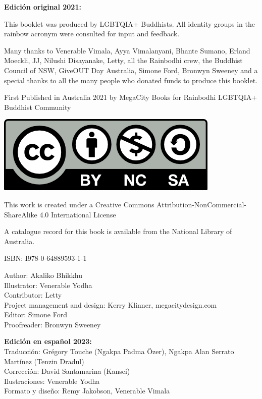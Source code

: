 \documentclass[12pt,openany]{book}
\begin{document}
{\footnotesize
\begin{center}
\noindent \textbf{Edición original 2021:}

This booklet was produced by LGBTQIA+ Buddhists. All identity groups in the rainbow acronym were consulted for input and feedback.

\noindent Many thanks to Venerable Vimala, Ayya Vimalanyani, Bhante Sumano, Erland Moeckli, JJ, Nilushi Disayanake, Letty, all the Rainbodhi crew, the Buddhist Council of NSW, GiveOUT Day Australia, Simone Ford, Bronwyn Sweeney and a special thanks to all the many people who donated funds to produce this booklet.

\medskip

\noindent First Published in Australia 2021 by MegaCity Books for Rainbodhi LGBTQIA+ Buddhist Community

\smallskip

\includegraphics{by-nc-sa}

\noindent This work is created under a Creative Commons Attribution-NonCommercial-ShareAlike 4.0 International License

\noindent A catalogue record for this book is available from the National Library of Australia.

\medskip

\noindent ISBN: I978-0-64889593-1-1

\medskip

Author: Akaliko Bhikkhu \\
Illustrator: Venerable Yodha \\
Contributor: Letty \\
Project management and design: Kerry Klinner, megacitydesign.com \\
Editor: Simone Ford \\
Proofreader: Bronwyn Sweeney

\bigskip

\textbf{Edición en español 2023:}  \\
Traducción: Grégory Touche (Ngakpa Padma Özer), Ngakpa Alan Serrato Martínez (Tenzin Dradul) \\
Corrección: David Santamarina (Kansei) \\
Ilustraciones: Venerable Yodha \\
Formato y diseño: Remy Jakobson, Venerable Vimala
\end{center}
}
\end{document}
